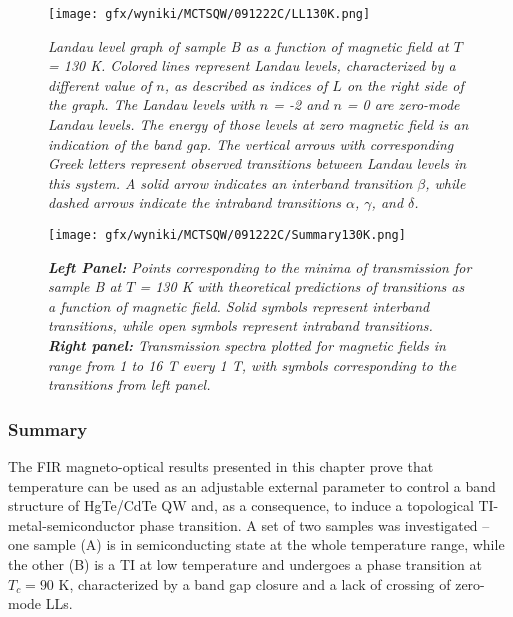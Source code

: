 \documentclass[titlepage,a4paper]{book}
\newcommand{\wciecie}{\quad\phantom{v}}
\begin{document}
\begin{figure}[H]
	\centering
	\texttt{[image: gfx/wyniki/MCTSQW/091222C/LL130K.png]}
	\vspace{-10pt}
	\caption{\textit{Landau level graph of sample B as a function of magnetic field at $T$ = 130 K. Colored lines represent Landau levels, characterized by a different value of $n$, as described as indices of $L$ on the right side of the graph. The Landau levels with $n$ = -2 and $n$ = 0 are zero-mode Landau levels. The energy of those levels at zero magnetic field is an indication of the band gap. The vertical arrows with corresponding Greek letters represent observed transitions between Landau levels in this system. A solid arrow indicates an interband transition $\beta$, while dashed arrows indicate the intraband transitions $\alpha$, $\gamma$, and $\delta$.}}
	\label{fig:LL_SQW_130K}
\end{figure}
\begin{figure}[H]
	\centering
	\texttt{[image: gfx/wyniki/MCTSQW/091222C/Summary130K.png]}
	\vspace{-10pt}
	\caption{\textit{\textbf{Left Panel:} Points corresponding to the minima of transmission for sample B at $T$ = 130 K with theoretical predictions of transitions as a function of magnetic field. Solid symbols represent interband transitions, while open symbols represent intraband transitions. \textbf{Right panel:} Transmission spectra plotted for magnetic fields in range from 1 to 16 T every 1 T, with symbols corresponding to the transitions from left panel.}}
	\label{fig:Summary_SQW_130K}
\end{figure}

\clearpage
\subsubsection{Summary}
\wciecie
The FIR magneto-optical results presented in this chapter prove that temperature can be used as an adjustable external parameter to control a band structure of HgTe/CdTe QW and, as a consequence, to induce a topological TI-metal-semiconductor phase transition. A set of two samples was investigated -- one sample (A) is in semiconducting state at the whole temperature range, while the other (B) is a TI at low temperature and undergoes a phase transition at $T_c = 90$ K, characterized by a band gap closure and a lack of crossing of zero-mode LLs. 
\end{document}
